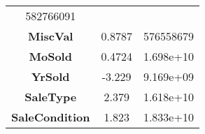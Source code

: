 \documentclass[]{article}
\begin{document}
\begin{longtable}[c]{@{}ccc@{}}
\begin{minipage}[t]{0.19\columnwidth}\centering\strut
582766091
\strut\end{minipage}\tabularnewline
\begin{minipage}[t]{0.25\columnwidth}\centering\strut
\textbf{MiscVal}
\strut\end{minipage} &
\begin{minipage}[t]{0.16\columnwidth}\centering\strut
0.8787
\strut\end{minipage} &
\begin{minipage}[t]{0.19\columnwidth}\centering\strut
576558679
\strut\end{minipage}\tabularnewline
\begin{minipage}[t]{0.25\columnwidth}\centering\strut
\textbf{MoSold}
\strut\end{minipage} &
\begin{minipage}[t]{0.16\columnwidth}\centering\strut
0.4724
\strut\end{minipage} &
\begin{minipage}[t]{0.19\columnwidth}\centering\strut
1.698e+10
\strut\end{minipage}\tabularnewline
\begin{minipage}[t]{0.25\columnwidth}\centering\strut
\textbf{YrSold}
\strut\end{minipage} &
\begin{minipage}[t]{0.16\columnwidth}\centering\strut
-3.229
\strut\end{minipage} &
\begin{minipage}[t]{0.19\columnwidth}\centering\strut
9.169e+09
\strut\end{minipage}\tabularnewline
\begin{minipage}[t]{0.25\columnwidth}\centering\strut
\textbf{SaleType}
\strut\end{minipage} &
\begin{minipage}[t]{0.16\columnwidth}\centering\strut
2.379
\strut\end{minipage} &
\begin{minipage}[t]{0.19\columnwidth}\centering\strut
1.618e+10
\strut\end{minipage}\tabularnewline
\begin{minipage}[t]{0.25\columnwidth}\centering\strut
\textbf{SaleCondition}
\strut\end{minipage} &
\begin{minipage}[t]{0.16\columnwidth}\centering\strut
1.823
\strut\end{minipage} &
\begin{minipage}[t]{0.19\columnwidth}\centering\strut
1.833e+10
\strut\end{minipage}\tabularnewline
\bottomrule
\end{longtable}
\end{document}
